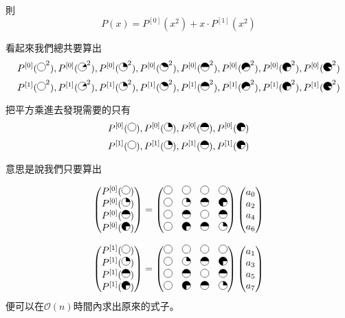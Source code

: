 則
$$P(x)=P^{[0]}(x^2)+x\cdot P^{[1]}(x^2)$$

看起來我們總共要算出
$$P^{[0]}(\pie{0}^2),P^{[0]}(\pie{45}^2),P^{[0]}(\pie{90}^2),P^{[0]}(\pie{135}^2),P^{[0]}(\pie{180}^2),P^{[0]}(\pie{225}^2),P^{[0]}(\pie{270}^2),P^{[0]}(\pie{315}^2)$$
$$P^{[1]}(\pie{0}^2),P^{[1]}(\pie{45}^2),P^{[1]}(\pie{90}^2),P^{[1]}(\pie{135}^2),P^{[1]}(\pie{180}^2),P^{[1]}(\pie{225}^2),P^{[1]}(\pie{270}^2),P^{[1]}(\pie{315}^2)$$

把平方乘進去發現需要的只有
$$P^{[0]}(\pie{0}),P^{[0]}(\pie{90}),P^{[0]}(\pie{180}),P^{[0]}(\pie{270})$$
$$P^{[1]}(\pie{0}),P^{[1]}(\pie{90}),P^{[1]}(\pie{180}),P^{[1]}(\pie{270})$$

意思是說我們只要算出

\[
\begin{pmatrix}    
P^{[0]}(\pie{0})\\
P^{[0]}(\pie{90})\\
P^{[0]}(\pie{180})\\
P^{[0]}(\pie{270})
\end{pmatrix} 
=
\begin{pmatrix}    
\pie{0}  & \pie{0} & \pie{0}  &\pie{0} \\     
\pie{0}  & \pie{90} & \pie{180} &\pie{270} \\     
\pie{0} & \pie{180} & \pie{0} & \pie{180} \\  
\pie{0} & \pie{270} & \pie{180} & \pie{90} \\     
\end{pmatrix}
\begin{pmatrix}    
a_0\\
a_2\\
a_4\\
a_6
\end{pmatrix}
\]

\[
\begin{pmatrix}    
P^{[1]}(\pie{0})\\
P^{[1]}(\pie{90})\\
P^{[1]}(\pie{180})\\
P^{[1]}(\pie{270})
\end{pmatrix} 
=
\begin{pmatrix}    
\pie{0}  & \pie{0} & \pie{0}  &\pie{0} \\     
\pie{0}  & \pie{90} & \pie{180} &\pie{270} \\     
\pie{0} & \pie{180} & \pie{0} & \pie{180} \\  
\pie{0} & \pie{270} & \pie{180} & \pie{90} \\     
\end{pmatrix}
\begin{pmatrix}    
a_1\\
a_3\\
a_5\\
a_7
\end{pmatrix}
\]
便可以在$\mathcal{O}(n)$時間內求出原來的式子。

